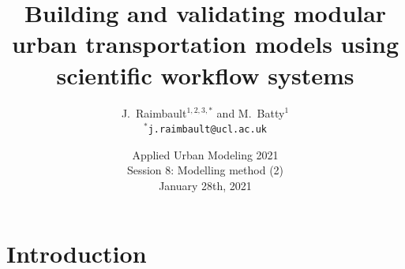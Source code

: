 



\title
[Modular urban transportation models]{Building and validating modular urban transportation models using scientific workflow systems}
\author[Raimbault]{J.~Raimbault$^{1,2,3,\ast}$ and M.~Batty$^{1}$\\\medskip
$^{\ast}$\texttt{j.raimbault@ucl.ac.uk}
}





\date[28/01/2021]{Applied Urban Modeling 2021\\
Session 8: Modelling method (2)\\
January 28th, 2021\\
}

\frame{\maketitle}



%  


\section{Introduction}




